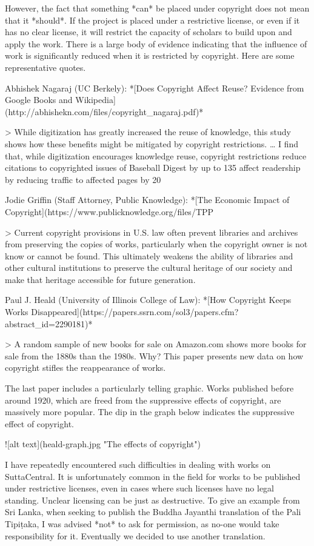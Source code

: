 \documentclass[11pt, openany,a5paper]{article}
\begin{document}
\begin{markdown}
However, the fact that something *can* be placed under copyright does not mean that it *should*. If the project is placed under a restrictive license, or even if it has no clear license, it will restrict the capacity of scholars to build upon and apply the work. There is a large body of evidence indicating that the influence of work is significantly reduced when it is restricted by copyright. Here are some representative quotes.

Abhishek Nagaraj (UC Berkely): *[Does Copyright Affect Reuse? Evidence from Google Books and Wikipedia](http://abhishekn.com/files/copyright_nagaraj.pdf)*

> While digitization has greatly increased the reuse of knowledge, this study
shows how these benefits might be mitigated by copyright restrictions. … I find that, while digitization encourages knowledge reuse, copyright restrictions reduce citations to copyrighted issues of Baseball Digest by up to 135%
affect readership by reducing traffic to affected pages by 20%

Jodie	Griffin (Staff Attorney, Public Knowledge): *[The Economic Impact of Copyright](https://www.publicknowledge.org/files/TPP%

> Current copyright provisions in U.S. law often prevent libraries and archives from preserving the copies of works, particularly when the copyright owner is not know or cannot be found. This ultimately weakens the ability of libraries and other cultural institutions to preserve the cultural heritage of our society and make that heritage accessible for future generation.

Paul J. Heald (University of Illinois College of Law): *[How Copyright Keeps Works Disappeared](https://papers.ssrn.com/sol3/papers.cfm?abstract_id=2290181)*

> A random sample of new books for sale on Amazon.com shows more books for sale from the 1880s than the 1980s. Why? This paper presents new data on how copyright stifles the reappearance of works.

The last paper includes a particularly telling graphic. Works published before around 1920, which are freed from the suppressive effects of copyright, are massively more popular. The dip in the graph below indicates the suppressive effect of copyright.

![alt text](heald-graph.jpg "The effects of copyright")

I have repeatedly encountered such difficulties in dealing with works on SuttaCentral. It is unfortunately common in the field for works to be published under restrictive licenses, even in cases where such licenses have no legal standing. Unclear licensing can be just as destructive. To give an example from Sri Lanka, when seeking to publish the Buddha Jayanthi translation of the Pali Tipiṭaka, I was advised *not* to ask for permission, as no-one would take responsibility for it. Eventually we decided to use another translation.


\end{markdown}
\end{document}
